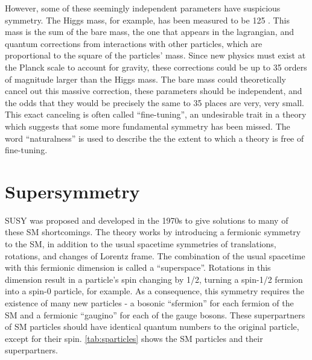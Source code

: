 However, some of these seemingly independent parameters have suspicious symmetry. The Higgs mass, for example, has been measured to be 125 \gev. This mass is the sum of the bare mass, the one that appears in the lagrangian, and quantum corrections from interactions with other particles, which are proportional to the square of the particles' mass. Since new physics must exist at the Planck scale to account for gravity, these corrections could be up to 35 orders of magnitude larger than the Higgs mass. The bare mass could theoretically cancel out this massive correction, these parameters should be independent, and the odds that they would be precisely the same to 35 places are very, very small. This exact canceling is often called ``fine-tuning'', an undesirable trait in a theory which suggests that some more fundamental symmetry has been missed. The word ``naturalness'' is used to describe the the extent to which a theory is free of fine-tuning. 


\section{Supersymmetry}

\ac{SUSY} was proposed and developed in the 1970s to give solutions to many of these \ac{SM} shortcomings. The theory works by introducing a fermionic symmetry to the \ac{SM}, in addition to the usual spacetime symmetries of translations, rotations, and changes of Lorentz frame. The combination of the usual spacetime with this fermionic dimension is called a ``superspace''. Rotations in this dimension result in a particle's spin changing by 1/2, turning a spin-1/2 fermion into a spin-0 particle, for example. As a consequence, this symmetry requires the existence of many new particles - a bosonic ``sfermion'' for each fermion of the \ac{SM} and a fermionic ``gaugino'' for each of the gauge bosons. These superpartners of \ac{SM} particles should have identical quantum numbers to the original particle, except for their spin. \autoref{tab:sparticles} shows the \ac{SM} particles and their superpartners. 


